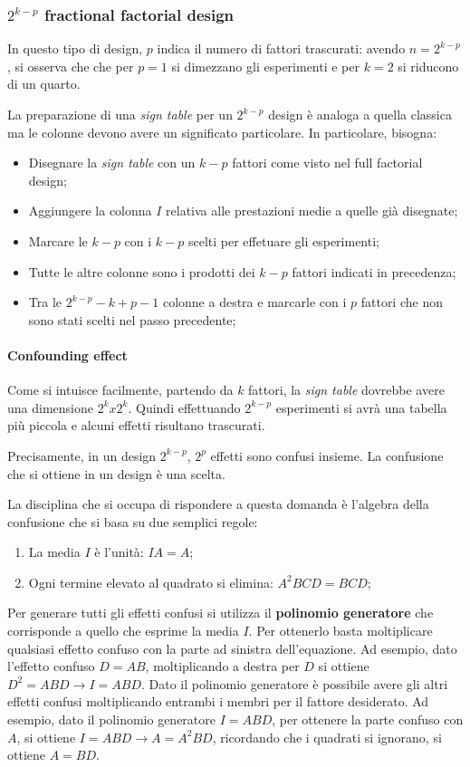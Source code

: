 \documentclass{article}
\begin{document}
\subsubsection{$2^{k-p}$ fractional factorial design}
In questo tipo di design, $p$ indica il numero di fattori trascurati: avendo $n = 2^{k-p}$, 
si osserva che che per $p=1$ si dimezzano gli esperimenti e per $k=2$ si riducono di un 
quarto. 

La preparazione di una \textit{sign table} per un $2^{k-p}$ design è analoga a quella
classica ma le colonne devono avere un significato particolare. In particolare, bisogna:
\begin{itemize}
  \item Disegnare la \textit{sign table} con un $k-p$ fattori come visto nel full factorial
    design;
  \item Aggiungere la colonna $I$ relativa alle prestazioni medie a quelle già disegnate;
  \item Marcare le $k-p$ con i $k-p$ scelti per effetuare gli esperimenti;
  \item Tutte le altre colonne sono i prodotti dei $k-p$ fattori indicati in precedenza;
  \item Tra le $2^{k-p}-k+p-1$ colonne a destra e marcarle con i $p$ fattori che non 
    sono stati scelti nel passo precedente;
\end{itemize}

\paragraph{Confounding effect}
Come si intuisce facilmente, partendo da $k$ fattori, la \textit{sign table} dovrebbe avere
una dimensione $2^kx2^k$. Quindi effettuando $2^{k-p}$ esperimenti si avrà una tabella più
piccola e alcuni effetti risultano trascurati. 

Precisamente, in un design $2^{k-p}$, $2^p$ effetti sono confusi insieme. La confusione che
si ottiene in un design è una scelta. 

La disciplina che si occupa di rispondere a questa domanda è l'algebra della confusione che
si basa su due semplici regole:
\begin{enumerate}
  \item La media $I$ è l'unità: $IA = A$;
  \item Ogni termine elevato al quadrato si elimina: $A^2BCD = BCD$;
\end{enumerate}

Per generare tutti gli effetti confusi si utilizza il \textbf{polinomio generatore} che
corrisponde a quello che esprime la media $I$. Per ottenerlo basta moltiplicare qualsiasi 
effetto confuso con la parte ad sinistra dell'equazione. Ad esempio, dato l'effetto confuso
$D = AB$, moltiplicando a destra per $D$ si ottiene $D^2 = ABD \to I = ABD$. Dato il 
polinomio generatore è possibile avere gli altri effetti confusi moltiplicando entrambi i 
membri per il fattore desiderato. Ad esempio, dato il polinomio generatore $I = ABD$, per 
ottenere la parte confuso con $A$, si ottiene $I = ABD \to A = A^2BD $, ricordando che i 
quadrati si ignorano, si ottiene $A = BD$.
\end{document}
